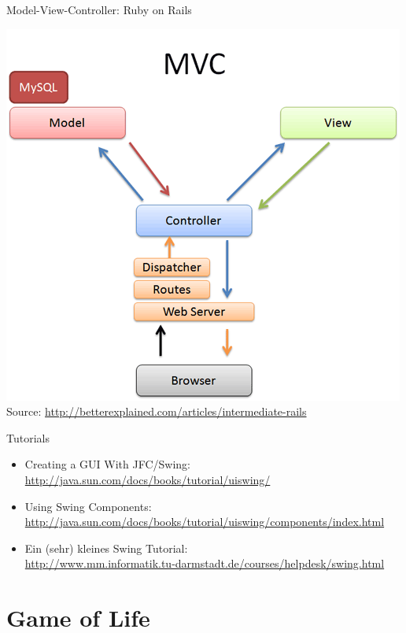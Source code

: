 \begin{frame}{Model-View-Controller: Ruby on Rails}
  \begin{center}
    \includegraphics[scale=0.4]{figures/mvc-rails} \\
    \tiny{Source: \url{http://betterexplained.com/articles/intermediate-rails}}
  \end{center}
\end{frame}

\begin{frame}{Tutorials}
  \begin{itemize}
  \item Creating a GUI With JFC/Swing:\\
    \url{http://java.sun.com/docs/books/tutorial/uiswing/}
  \item Using Swing Components:\\
    \url{http://java.sun.com/docs/books/tutorial/uiswing/components/index.html}
  \item Ein (sehr) kleines Swing Tutorial:\\
    \url{http://www.mm.informatik.tu-darmstadt.de/courses/helpdesk/swing.html}
  \end{itemize}
\end{frame}


\section{Game of Life}

